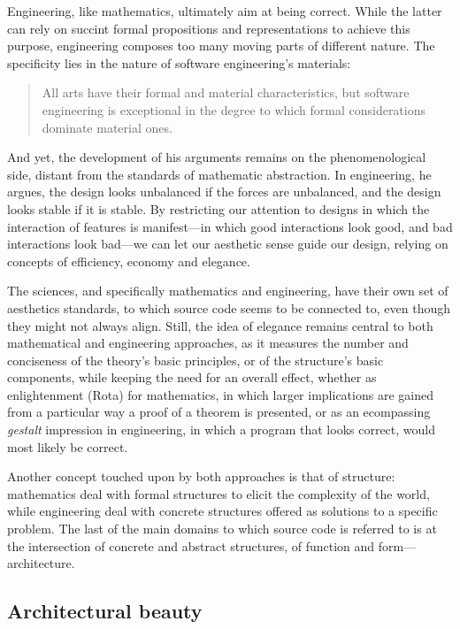 Engineering, like mathematics, ultimately aim at being correct. While the latter can rely on succint formal propositions and representations to achieve this purpose, engineering composes too many moving parts of different nature. The specificity lies in the nature of software engineering's materials:

\begin{quote}
  All arts have their formal and material characteristics, but software engineering is exceptional in the degree to which formal considerations dominate material ones.\cite{schummer_aesthetic_2009}
\end{quote}

And yet, the development of his arguments remains on the phenomenological side, distant from the standards of mathematic abstraction. In engineering, he argues, the design looks unbalanced if the forces are unbalanced, and the design looks stable if it is stable.  By restricting our attention to designs in which the interaction of features is manifest—in which good interactions look good, and bad interactions look bad—we can let our aesthetic sense guide our design, relying on concepts of efficiency, economy and elegance\cite{mclennan_who_1997}.

\vspace*{1\baselineskip}

The sciences, and specifically mathematics and engineering, have their own set of aesthetics standards, to which source code seems to be connected to, even though they might not always align. Still, the idea of elegance remains central to both mathematical and engineering approaches, as it measures the number and conciseness of the theory's basic principles, or of the structure's basic components, while keeping the need for an overall effect, whether as enlightenment (Rota) for mathematics, in which larger implications are gained from a particular way a proof of a theorem is presented, or as an ecompassing \emph{gestalt} impression in engineering, in which a program that looks correct, would most likely be correct.

Another concept touched upon by both approaches is that of structure: mathematics deal with formal structures to elicit the complexity of the world, while engineering deal with concrete structures offered as solutions to a specific problem. The last of the main domains to which source code is referred to is at the intersection of concrete and abstract structures, of function and form—architecture.


\subsection{Architectural beauty}

